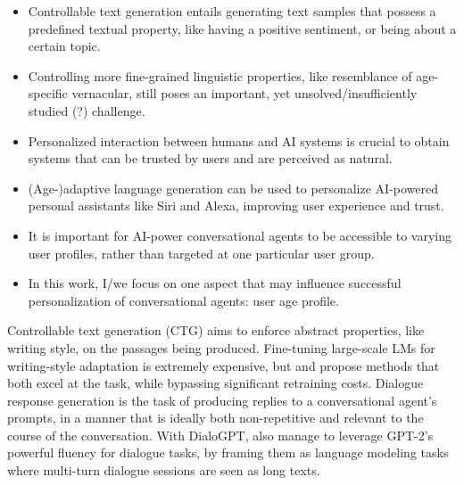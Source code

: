 \begin{itemize}
    \item Controllable text generation entails generating text samples that possess a predefined textual property, like having a positive sentiment, or being about a certain topic.
    \item Controlling more fine-grained linguistic properties, like resemblance of age-specific vernacular, still poses an important, yet unsolved/insufficiently studied (?) challenge.
    \item Personalized interaction between humans and AI systems is crucial to obtain systems that can be trusted by users and are perceived as natural.
    \item (Age-)adaptive language generation can be used to personalize AI-powered personal assistants like Siri and Alexa, improving user experience and trust.
    \item It is important for AI-power conversational agents to be accessible to varying user profiles, rather than targeted at one particular user group. 
    \item In this work, I/we focus on one aspect that may influence successful personalization of conversational agents: user age profile.
\end{itemize}

Controllable text generation (CTG) aims to enforce abstract properties, like writing style, on the passages being produced. Fine-tuning large-scale LMs for writing-style adaptation is extremely expensive, but \cite{dathathri2019plug} and \cite{li-etal-2020-optimus} propose methods that both excel at the task, while bypassing significant retraining costs. Dialogue response generation is the task of producing replies to a conversational agent's prompts, in a manner that is ideally both non-repetitive and relevant to the course of the conversation. With DialoGPT, \cite{zhang2019dialogpt} also manage to leverage GPT-2's powerful fluency for dialogue tasks, by framing them as language modeling tasks where multi-turn dialogue sessions are seen as long texts.


